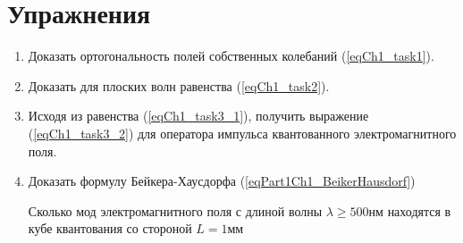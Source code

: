 \section{Упражнения}
\begin{enumerate}
\item Доказать ортогональность полей собственных колебаний
  (\ref{eqCh1_task1}).  
\item Доказать для плоских волн равенства (\ref{eqCh1_task2}).
\item Исходя из равенства (\ref{eqCh1_task3_1}), получить выражение
  (\ref{eqCh1_task3_2}) для оператора импульса квантованного
  электромагнитного поля. 
\item Доказать формулу Бейкера-Хаусдорфа (\ref{eqPart1Ch1_BeikerHausdorf})
\item [Сколько мод\label{qQuantelNumberMods}] электромагнитного поля с длиной волны
  $\lambda \ge 500 \mbox{нм}$ находятся в кубе квантования со стороной
  $L=1 \mbox{мм}$ \cite{courseIntroQuantumOpticsCoursera}
\end{enumerate}
